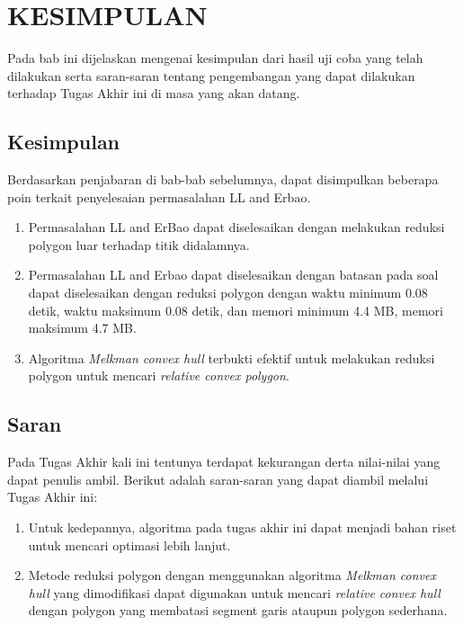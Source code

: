 \chapter{KESIMPULAN}
Pada bab ini dijelaskan mengenai kesimpulan dari hasil uji coba yang telah dilakukan serta saran-saran tentang pengembangan yang dapat dilakukan terhadap Tugas Akhir ini di masa yang akan datang.
\section{Kesimpulan}
Berdasarkan penjabaran di bab-bab sebelumnya, dapat disimpulkan beberapa poin terkait penyelesaian permasalahan LL and Erbao.
\begin{enumerate}
\item Permasalahan LL and ErBao dapat diselesaikan dengan melakukan reduksi polygon luar terhadap titik didalamnya.
\item Permasalahan LL and Erbao dapat diselesaikan dengan batasan pada soal dapat diselesaikan dengan reduksi polygon dengan waktu minimum 0.08 detik, waktu maksimum 0.08 detik, dan memori minimum 4.4 MB, memori maksimum 4.7 MB.
\item Algoritma \textit{Melkman convex hull} terbukti efektif untuk melakukan reduksi polygon untuk mencari \textit{relative convex polygon}.
\end{enumerate}
\section{Saran}
Pada Tugas Akhir kali ini tentunya terdapat kekurangan derta nilai-nilai yang dapat penulis ambil. Berikut adalah saran-saran yang dapat diambil melalui Tugas Akhir ini:
\begin{enumerate}
 \item Untuk kedepannya, algoritma pada tugas akhir ini dapat menjadi bahan riset untuk mencari optimasi lebih lanjut.
 \item Metode reduksi polygon dengan menggunakan algoritma \textit{Melkman convex hull} yang dimodifikasi dapat digunakan untuk mencari \textit{relative convex hull} dengan polygon yang membatasi segment garis ataupun polygon sederhana.
\end{enumerate}